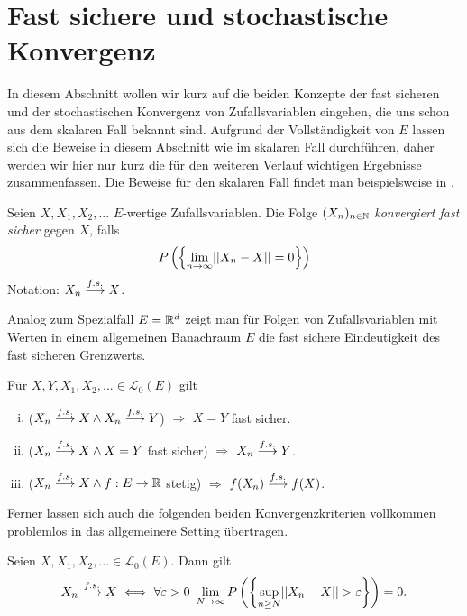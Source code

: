 \section{Fast sichere und stochastische Konvergenz}
In diesem Abschnitt wollen wir kurz auf die beiden Konzepte der fast sicheren und der stochastischen Konvergenz von Zufallsvariablen eingehen, die uns schon aus dem skalaren Fall bekannt sind. 
Aufgrund der Vollständigkeit von $E$ lassen sich die Beweise in diesem Abschnitt wie im skalaren Fall durchführen, daher werden wir hier nur kurz die für den weiteren Verlauf wichtigen Ergebnisse zusammenfassen.  
Die Beweise für den skalaren Fall findet man beispielsweise in \cite{gs}. 
\begin{mydef}
    Seien $X, X_1, X_2,...$ $E$-wertige Zufallsvariablen. Die Folge $(X_n)_{n \in \mathbb{N}}$ \textit{konvergiert fast sicher} gegen $X$, falls
    $$
        P\left(\left\{ \lim_{n \to \infty} \lvert\lvert X_n - X \rvert\rvert = 0 \right\}\right)
    $$
Notation: $X_n \overset{f.s.}{\longrightarrow} X$. 
\end{mydef}

Analog zum Spezialfall $E = \mathbb{R}^d$ zeigt man für Folgen von Zufallsvariablen mit Werten in einem allgemeinen Banachraum $E$ die fast sichere Eindeutigkeit des fast sicheren Grenzwerts. 
\begin{proposition}
    Für $X,Y,X_1,X_2,... \in \mathcal{L}_0(E)$ gilt 
    \begin{enumerate}[(i)]
        \item ($X_n \overset{f.s.}{\longrightarrow} X \land X_n \overset{f.s.}{\longrightarrow} Y$) $\Rightarrow$ $ X = Y$ fast sicher. 
        \item ($X_n \overset{f.s.}{\longrightarrow} X \land X = Y$ fast sicher) $\Rightarrow$ $X_n \overset{f.s.}{\longrightarrow} Y$. 
        \item ($X_n \overset{f.s.}{\longrightarrow} X \land f:E \to \mathbb{R}$ stetig) $\Rightarrow$ $f(X_n) \overset{f.s.}{\longrightarrow} f(X)$. 
    \end{enumerate}
\end{proposition}

Ferner lassen sich auch die folgenden beiden Konvergenzkriterien vollkommen problemlos in das allgemeinere Setting übertragen. 

\begin{theorem}
    Seien $X, X_1,X_2,... \in \mathcal{L}_0(E)$. Dann gilt
    \begin{align*}
        X_n \overset{f.s.}{\longrightarrow} X \iff \forall \varepsilon > 0 \ \lim_{N \to \infty}P\left(\left\{ \sup_{n \geq N}\lvert\lvert X_n - X \rvert\rvert > \varepsilon \right\}\right) = 0.
    \end{align*}
\end{theorem}

